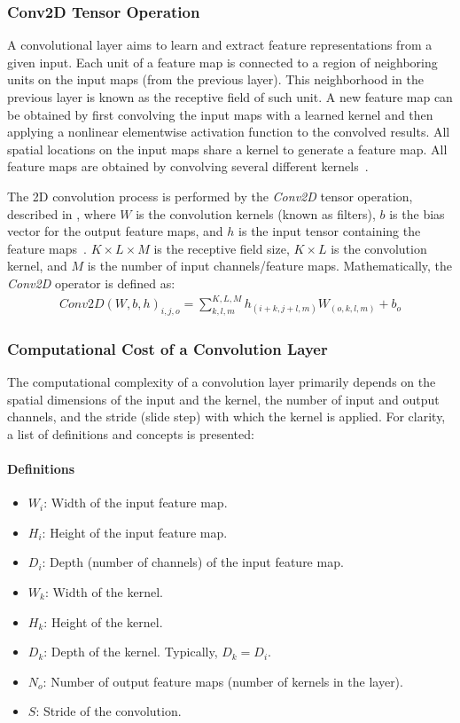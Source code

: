 \subsubsection{Conv2D Tensor Operation}
A convolutional layer aims to learn and extract feature representations from a given input. Each unit of a feature map is connected to a region of neighboring units on the input maps (from the previous layer). This neighborhood in the previous layer is known as the receptive field of such unit. A new feature map can be obtained by first convolving the input maps with a learned kernel and then applying a nonlinear elementwise activation function to the convolved results. All spatial locations on the input maps share a kernel to generate a feature map. All feature maps are obtained by convolving several different kernels~\cite{gu2018recent}.


The 2D convolution process is performed by the \emph{Conv2D} tensor operation, described in , where $W$ is the convolution kernels (known as filters), $b$ is the bias vector for the output feature maps, and $h$ is the input tensor containing the feature maps~\cite{goodfellow2016deep}. $K\times L\times M$ is the receptive field size, $K\times L$ is the convolution kernel, and $M$ is the number of input channels/feature maps. Mathematically, the \emph{Conv2D} operator is defined as:
\begin{eqnarray} \label{eq:conv2D}
Conv2D\left(W,b,h\right)_{i,j,o}=\sum_{k,l,m}^{K,L,M} h_{(i+k,j+l,m)} W_{(o,k,l,m)}+b_{o}
\end{eqnarray}

\subsubsection{Computational Cost of a Convolution Layer}

The computational complexity of a convolution layer primarily depends on the spatial dimensions of the input and the kernel, the number of input and output channels, and the stride (slide step) with which the kernel is applied. For clarity, a list of definitions and concepts is presented:

\paragraph{Definitions}
\begin{itemize}
	\item \( W_i \): Width of the input feature map.
	\item \( H_i \): Height of the input feature map.
	\item \( D_i \): Depth (number of channels) of the input feature map.
	\item \( W_k \): Width of the kernel.
	\item \( H_k \): Height of the kernel.
	\item \( D_k \): Depth of the kernel. Typically, \( D_k = D_i \).
	\item \( N_o \): Number of output feature maps (number of kernels in the layer).
	\item \( S \): Stride of the convolution.
\end{itemize}

